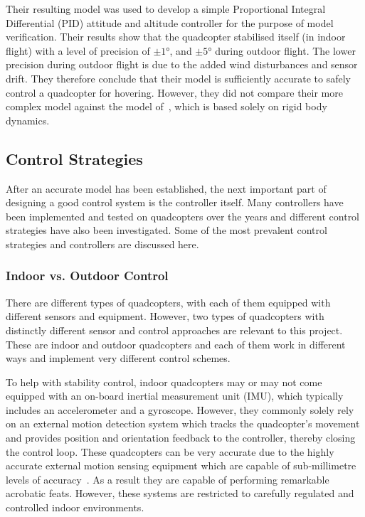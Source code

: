 Their resulting model was used to develop a simple Proportional Integral Differential (PID) attitude and altitude controller for the purpose of model verification. Their results show that the quadcopter stabilised itself (in indoor flight) with a level of precision of $\pm\ang{1}$, and $\pm\ang{5}$ during outdoor flight. The lower precision during outdoor flight is due to the added wind disturbances and sensor drift. They therefore conclude that their model is sufficiently accurate to safely control a quadcopter for hovering. However, they did not compare their more complex model against the model of~\citeauthor{hamel2002dynamic}, which is based solely on rigid body dynamics. 

\subsection{Control Strategies}

After an accurate model has been established, the next important part of designing a good control system is the controller itself. Many controllers have been implemented and tested on quadcopters over the years and different control strategies have also been investigated. Some of the most prevalent control strategies and controllers are discussed here.

\subsubsection*{Indoor vs. Outdoor Control}

There are different types of quadcopters, with each of them equipped with different sensors and equipment. However, two types of quadcopters with distinctly different sensor and control approaches are relevant to this project. These are indoor and outdoor quadcopters and each of them work in different ways and implement very different control schemes. 

To help with stability control, indoor quadcopters may or may not come equipped with an on-board inertial measurement unit (IMU), which typically includes an accelerometer and a gyroscope. However, they commonly solely rely on an external motion detection system which tracks the quadcopter's movement and provides position and orientation feedback to the controller, thereby closing the control loop. These quadcopters can be very accurate due to the highly accurate external motion sensing equipment which are capable of sub-millimetre levels of accuracy~\citep{richards1999measurement}. As a result they are capable of performing remarkable acrobatic feats. However, these systems are restricted to carefully regulated and controlled indoor environments.

